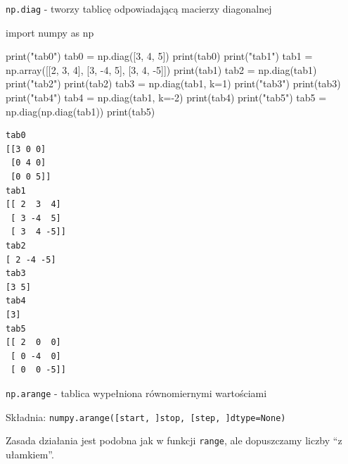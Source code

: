 \documentclass[
  polish,
  letterpaper,
  DIV=11,
  numbers=noendperiod]{scrreprt}
\newenvironment{Shaded}{\begin{snugshade}}{\end{snugshade}}
\newcommand{\BuiltInTok}[1]{\textcolor[rgb]{0.00,0.23,0.31}{#1}}
\newcommand{\DecValTok}[1]{\textcolor[rgb]{0.68,0.00,0.00}{#1}}
\newcommand{\ImportTok}[1]{\textcolor[rgb]{0.00,0.46,0.62}{#1}}
\newcommand{\NormalTok}[1]{\textcolor[rgb]{0.00,0.23,0.31}{#1}}
\newcommand{\OperatorTok}[1]{\textcolor[rgb]{0.37,0.37,0.37}{#1}}
\newcommand{\StringTok}[1]{\textcolor[rgb]{0.13,0.47,0.30}{#1}}
\begin{document}
\texttt{np.diag} - tworzy tablicę odpowiadającą macierzy diagonalnej

\begin{Shaded}
\begin{Highlighting}[]
\ImportTok{import}\NormalTok{ numpy }\ImportTok{as}\NormalTok{ np}

\BuiltInTok{print}\NormalTok{(}\StringTok{"tab0"}\NormalTok{)}
\NormalTok{tab0 }\OperatorTok{=}\NormalTok{ np.diag([}\DecValTok{3}\NormalTok{, }\DecValTok{4}\NormalTok{, }\DecValTok{5}\NormalTok{])}
\BuiltInTok{print}\NormalTok{(tab0)}
\BuiltInTok{print}\NormalTok{(}\StringTok{"tab1"}\NormalTok{)}
\NormalTok{tab1 }\OperatorTok{=}\NormalTok{ np.array([[}\DecValTok{2}\NormalTok{, }\DecValTok{3}\NormalTok{, }\DecValTok{4}\NormalTok{], [}\DecValTok{3}\NormalTok{, }\OperatorTok{{-}}\DecValTok{4}\NormalTok{, }\DecValTok{5}\NormalTok{], [}\DecValTok{3}\NormalTok{, }\DecValTok{4}\NormalTok{, }\OperatorTok{{-}}\DecValTok{5}\NormalTok{]])}
\BuiltInTok{print}\NormalTok{(tab1)}
\NormalTok{tab2 }\OperatorTok{=}\NormalTok{ np.diag(tab1)}
\BuiltInTok{print}\NormalTok{(}\StringTok{"tab2"}\NormalTok{)}
\BuiltInTok{print}\NormalTok{(tab2)}
\NormalTok{tab3 }\OperatorTok{=}\NormalTok{ np.diag(tab1, k}\OperatorTok{=}\DecValTok{1}\NormalTok{)}
\BuiltInTok{print}\NormalTok{(}\StringTok{"tab3"}\NormalTok{)}
\BuiltInTok{print}\NormalTok{(tab3)}
\BuiltInTok{print}\NormalTok{(}\StringTok{"tab4"}\NormalTok{)}
\NormalTok{tab4 }\OperatorTok{=}\NormalTok{ np.diag(tab1, k}\OperatorTok{={-}}\DecValTok{2}\NormalTok{)}
\BuiltInTok{print}\NormalTok{(tab4)}
\BuiltInTok{print}\NormalTok{(}\StringTok{"tab5"}\NormalTok{)}
\NormalTok{tab5 }\OperatorTok{=}\NormalTok{ np.diag(np.diag(tab1))}
\BuiltInTok{print}\NormalTok{(tab5)}
\end{Highlighting}
\end{Shaded}

\begin{verbatim}
tab0
[[3 0 0]
 [0 4 0]
 [0 0 5]]
tab1
[[ 2  3  4]
 [ 3 -4  5]
 [ 3  4 -5]]
tab2
[ 2 -4 -5]
tab3
[3 5]
tab4
[3]
tab5
[[ 2  0  0]
 [ 0 -4  0]
 [ 0  0 -5]]
\end{verbatim}

\texttt{np.arange} - tablica wypełniona równomiernymi wartościami

Składnia:
\texttt{numpy.arange({[}start,\ {]}stop,\ {[}step,\ {]}dtype=None)}

Zasada działania jest podobna jak w funkcji \texttt{range}, ale
dopuszczamy liczby ``z ułamkiem''.
\end{document}
